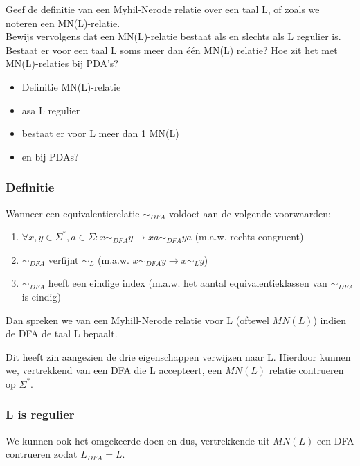 \begin{quest}[Vraag 5]
  Geef de definitie van een Myhil-Nerode relatie over een taal L, of zoals we noteren een MN(L)-relatie. \\
  Bewijs vervolgens dat een MN(L)-relatie bestaat als en slechts als L regulier is. Bestaat er voor een taal L soms meer dan één MN(L) relatie? Hoe zit het met MN(L)-relaties bij PDA’s?
\end{quest}

\begin{itemize}
  \item Definitie MN(L)-relatie
  \item asa L regulier
  \item bestaat er voor L meer dan 1 MN(L)
  \item en bij PDAs?
\end{itemize}

\subsubsection*{Definitie}

\begin{theorem}
  Wanneer een equivalentierelatie $\sim_{DFA}$ voldoet aan de volgende voorwaarden:
  \begin{enumerate}
    \item $\forall x, y \in \Sigma^*, a \in \Sigma : x \sim_{DFA} y \rightarrow xa \sim_{DFA} ya$ (m.a.w. rechts congruent)
    \item $\sim_{DFA}$ verfijnt $\sim_L$ (m.a.w. $x \sim_{DFA} y \rightarrow x \sim_L y$)
    \item $\sim_{DFA}$ heeft een eindige index (m.a.w. het aantal equivalentieklassen van $\sim_{DFA}$ is eindig)
  \end{enumerate}
  Dan spreken we van een Myhill-Nerode relatie voor L (oftewel $MN(L)$) indien de DFA de taal L bepaalt.
\end{theorem}

Dit heeft zin aangezien de drie eigenschappen verwijzen naar L. Hierdoor kunnen we, vertrekkend van een DFA die L accepteert, een $MN(L)$ relatie contrueren op $\Sigma^*$.

\subsubsection*{L is regulier}

We kunnen ook het omgekeerde doen en dus, vertrekkende uit $MN(L)$ een DFA contrueren zodat $L_{DFA} = L$.

